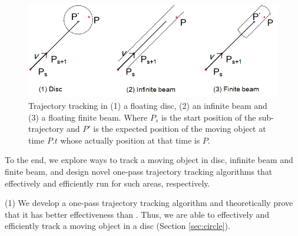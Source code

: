 

\begin{figure}[tb!]
	\centering
	\includegraphics[scale=1.0]{Figures/Fig-Areas.png}\vspace{-1ex}
	\vspace{-1ex}
	\caption{\small Trajectory tracking in (1) a floating disc, (2) an infinite beam \cite{Chen:Space,Daescu:metric} and (3) a floating finite beam. Where $P_s$ is the start position of the sub-trajectory and $P'$ is the expected position of the moving object at time $P.t$ whose actually position at that time is $P$.}
	\vspace{-3ex}
	\label{fig:areas}
\end{figure}

To the end, we explore ways to track a moving object in disc, infinite beam and finite beam, and design novel one-pass trajectory tracking algorithms that effectively and efficiently run for such areas, respectively. 

\ni (1) We develop a one-pass trajectory tracking algorithm \citt and theoretically prove that it has better effectiveness than \ldrh. Thus, we are able to effectively and efficiently track a moving object in a disc (Section \ref{sec:circle}).


